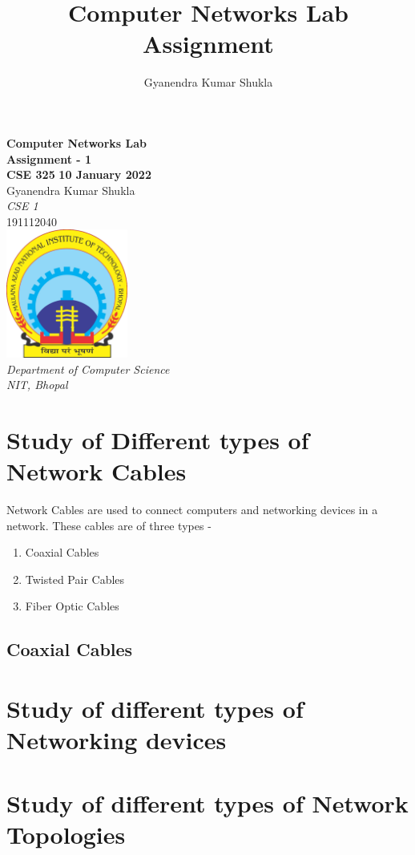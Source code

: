 \documentclass[14pt,a4paper]{article}
\author{Gyanendra Kumar Shukla}
\title{Computer Networks Lab Assignment}
\begin{document}
	\begin{titlepage}
		\centering
		\vfill
		{\bfseries\Huge
			Computer Networks Lab \\
			Assignment - 1\\
			\vskip0.5cm
			CSE 325
		}
		{\LARGE
			\vskip3cm
			\textbf{10 January 2022}\\
			\vskip3cm
			Gyanendra Kumar Shukla\\
			\textit{CSE 1}\\
			191112040\\
		}    
		\vfill
		\vfill
		\includegraphics[width=4cm]{manitlogo.png} %
		\\
		{\textit{
				Department of Computer Science\\
				NIT, Bhopal\\
		}}
		\vfill
		\vfill
	\end{titlepage}
	\newpage
	
	
	
	\tableofcontents
	
	
	\newpage
	
	\section{Study of Different types of Network Cables}
	Network Cables are used to connect computers and networking devices in a network. These cables are of three types - 
	\begin{enumerate}
		\item Coaxial Cables
		\item Twisted Pair Cables
		\item Fiber Optic Cables
	\end{enumerate}
	
	\subsection{Coaxial Cables}
	
	\section{Study of different types of Networking devices}
	
	\section{Study of different types of Network Topologies}
	
\end{document}
